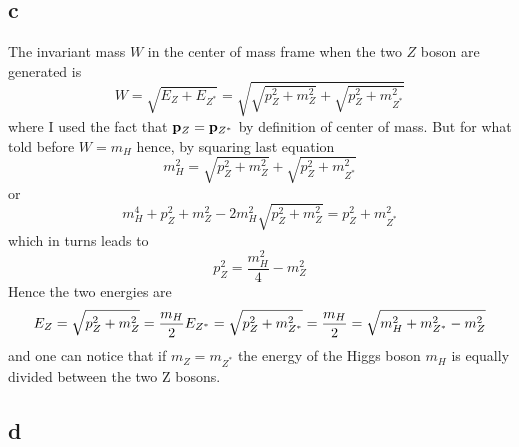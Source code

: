 \subsection*{c}
The invariant mass $W$ in the center of mass frame when the two $Z$ boson are generated is
\begin{equation*}
    W = \sqrt{E_Z + E_{Z^*}} = \sqrt{ \sqrt{p_Z^2 + m_Z^2} + \sqrt{p_Z^2 + m_{Z^*}^2}}
\end{equation*}
where I used the fact that $\mathbf{p}_Z = \mathbf{p}_{Z^*}$ by definition of center of mass. But for what told before $W=m_H$ hence, by squaring last equation 
\begin{equation*}
    m_H^2 = \sqrt{p_Z^2 + m_Z^2} + \sqrt{p_Z^2 + m_{Z^*}^2}
\end{equation*}
or
\begin{equation*}
    m_H^4 + p_Z^2 + m_Z^2 - 2m_H^2\sqrt{p_Z^2 + m_Z^2} = p_Z^2 + m_{Z^*}^2
\end{equation*}
which in turns leads to
\begin{equation*}
    p_Z^2 = \frac{m_H^2}{4} - m_Z^2
\end{equation*}
Hence the two energies are
\begin{equation*}
    E_Z = \sqrt{p_Z^2 + m_Z^2} = \frac{m_H}{2} \\
    E_{Z^*} = \sqrt{p_Z^2 + m_{Z^*}^2} = \frac{m_H}{2} = \sqrt{m_H^2 + m_{Z^*}^2 - m_Z^2}
\end{equation*}
and one can notice that if $m_Z = m_{Z^*}$ the energy of the Higgs boson $m_H$ is equally divided between the two Z bosons.
\subsection*{d}